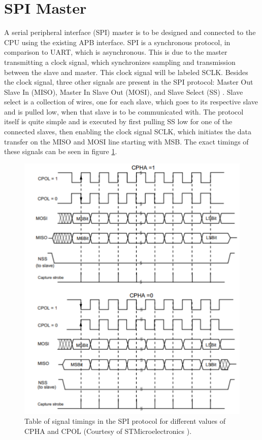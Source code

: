\documentclass[./dissertation.tex]{subfiles}
\begin{document}
\section{SPI Master}
\label{spi_sec}
A serial peripheral interface (SPI) master is to be designed and connected to the CPU using the existing APB interface. SPI is a synchronous protocol, in comparison to UART, which is asynchronous. This is due to the master transmitting a clock signal, which synchronizes sampling and transmission between the slave and master. This clock signal will be labeled SCLK. Besides the clock signal, three other signals are present in the SPI protocol: Master Out Slave In (MISO), Master In Slave Out (MOSI), and Slave Select (SS) \cite{SPIManualSTM}. Slave select is a collection of wires, one for each slave, which goes to its respective slave and is pulled low, when that slave is to be communicated with. The protocol itself is quite simple and is executed by first pulling SS low for one of the connected slaves, then enabling the clock signal SCLK, which initiates the data transfer on the MISO and MOSI line starting with MSB. The exact timings of these signals can be seen in figure \ref{fig:spi_timings}.

\begin{figure}[H]
    \centering
    \includegraphics[width=\linewidth]{subfiles/imgs/IP_Blocks_Pics/spi_signal_diagram.pdf}
    \caption{Table of signal timings in the SPI protocol for different values of CPHA and CPOL (Courtesy of STMicroelectronics \cite{SPIManualSTM}).}
    \label{fig:spi_timings}
\end{figure}
\end{document}
